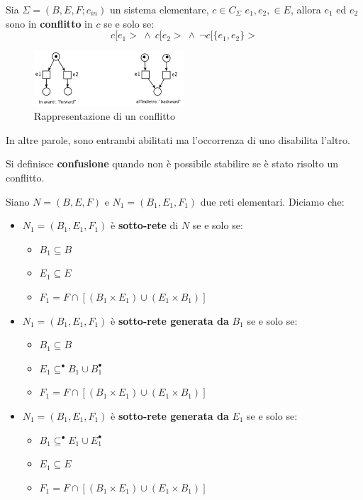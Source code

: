 \begin{definizione}
    Sia $\Sigma = (B, E, F; c_{in})$ un sistema elementare,
    $c \in C_{\Sigma}$ $e_1, e_2, \in E$, allora $e_1$ ed $e_2$ sono in
    \textbf{conflitto} in $c$ se e solo se:
    \begin{equation}
        c[e_1 > \ \land \ c[e_2 > \ \land \ \lnot c[\{e_1, e_2\} >
    \end{equation}
    \begin{figure}[!ht]
        \centering
        \includegraphics[width=0.5\textwidth]{img/reti/conf.png}
        \caption{Rappresentazione di un conflitto}
    \end{figure}
    In altre parole, sono entrambi abilitati ma l'occorrenza di uno disabilita
    l'altro.
\end{definizione}
Si definisce \textbf{confusione} quando non è possibile stabilire se è stato
risolto un conflitto.
\newpage
\begin{definizione}
    Siano $N = (B, E, F)$ e $N_1 = (B_1, E_1, F_1)$ due reti elementari. Diciamo che:
    \begin{itemize}
        \item $N_1 = (B_1, E_1, F_1)$ è \textbf{sotto-rete} di $N$ se e solo se:
              \begin{itemize}
                  \item $B_1 \subseteq B$
                  \item $E_1 \subseteq E$
                  \item $F_1 = F \cap [(B_1 \times E_1) \cup (E_1 \times B_1)]$
              \end{itemize}
        \item $N_1 = (B_1, E_1, F_1)$ è \textbf{sotto-rete generata da} $B_1$ se e solo se:
              \begin{itemize}
                  \item $B_1 \subseteq B$
                  \item $E_1 \subseteq ^{\bullet} B_1 \cup B_1^{\bullet}$
                  \item $F_1 = F \cap [(B_1 \times E_1) \cup (E_1 \times B_1)]$
              \end{itemize}
        \item $N_1 = (B_1, E_1, F_1)$ è \textbf{sotto-rete generata da} $E_1$ se e solo se:
              \begin{itemize}
                  \item $B_1 \subseteq ^{\bullet} E_1 \cup E_1^{\bullet}$
                  \item $E_1 \subseteq E$
                  \item $F_1 = F \cap [(B_1 \times E_1) \cup (E_1 \times B_1)]$
              \end{itemize}
    \end{itemize}
\end{definizione}
